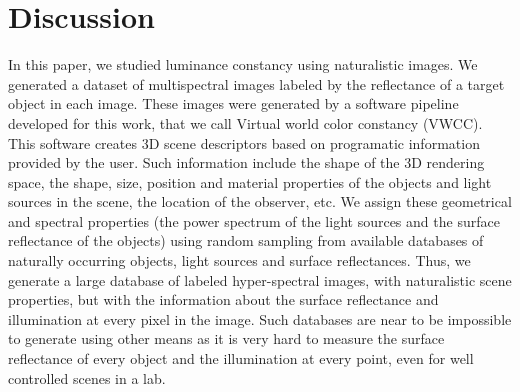 \documentclass{jov}
\begin{document}
\section{Discussion} \label{Discussion}
In this paper, we studied luminance constancy using naturalistic images. We generated a dataset of multispectral images labeled by the reflectance of a target object in each image. These images were generated by a software pipeline developed for this work, that we call Virtual world color constancy (VWCC). This software creates 3D scene descriptors based on programatic information provided by the user. Such information include the shape of the 3D rendering space, the shape, size, position and material properties of the objects and light sources in the scene, the location of the observer, etc. We assign these geometrical and spectral properties (the power spectrum of the light sources and the surface reflectance of the objects) using random sampling from available databases of naturally occurring objects, light sources and surface reflectances. Thus, we generate a large database of labeled hyper-spectral images, with naturalistic scene properties, but with the information about the surface reflectance and illumination at every pixel in the image. Such databases are near to be impossible to generate using other means as it is very hard to measure the surface reflectance of every object and the illumination at every point, even for well controlled scenes in a lab.
\end{document}
